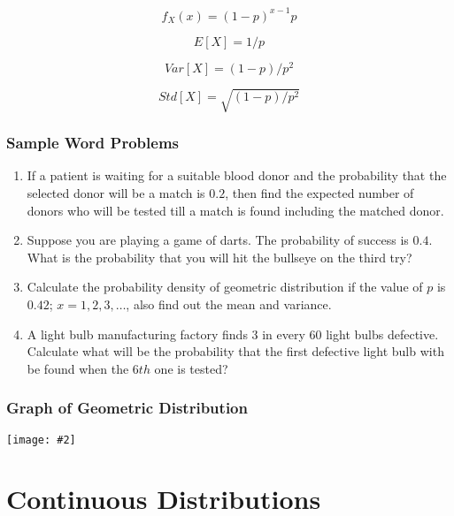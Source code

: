 \documentclass[a4paper]{article}
\newcommand*{\newincludegraphics}[2][]{
    \begin{center}
        \begin{adjustbox}{max size={\textwidth}{\textheight}}
            \texttt{[image: \#2]}
        \end{adjustbox}
    \end{center}
}
\begin{document}
    \begin{equation}
        \label{eq:geometric_pmf}
        f_X(x) = {(1-p)}^{x-1}p
    \end{equation}

    \begin{equation}
        \label{eq:geometric_mean}
        E[X] = 1/p
    \end{equation}

    \begin{equation}
        \label{eq:geometric_variance}
        Var[X] = {(1 - p)} / p^2
    \end{equation}

    \begin{equation}
        \label{eq:geometric_std}
        Std[X] = \sqrt{(1 - p) / p^2}
    \end{equation}

    \subsubsection*{Sample Word Problems}
    \begin{enumerate}
        \item If a patient is waiting for a suitable blood donor and the probability that the selected donor will be a match is $0.2$, then find the expected number of donors who will be tested till a match is found including the matched donor.
        \item Suppose you are playing a game of darts. The probability of success is $0.4$. What is the probability that you will hit the bullseye on the third try?
        \item Calculate the probability density of geometric distribution if the value of $p$ is $0.42$; $x = 1, 2, 3, \ldots$, also find out the mean and variance.
        \item A light bulb manufacturing factory finds $3$ in every $60$ light bulbs defective. Calculate what will be the probability that the first defective light bulb with be found when the $6th$ one is tested?
    \end{enumerate}

    \subsubsection*{Graph of Geometric Distribution}
    \newincludegraphics[]{(D)-Geometric_distribution_visualization.png}


    \section{Continuous Distributions}
\end{document}
